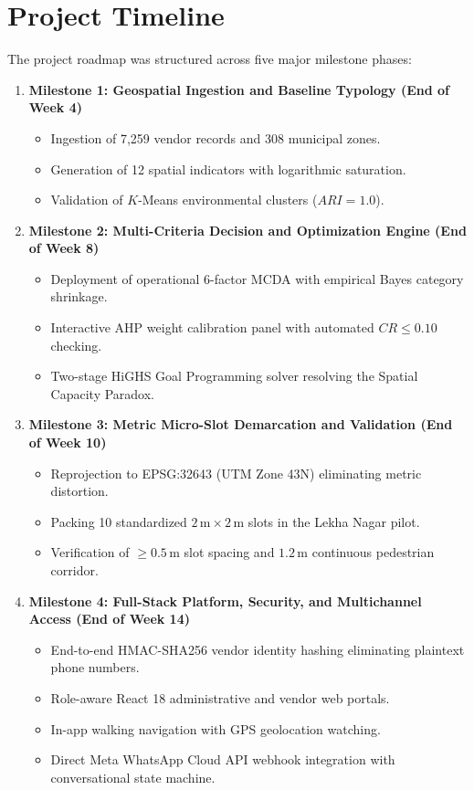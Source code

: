 \section{Project Timeline}
\label{sec:project_timeline}

The project roadmap was structured across five major milestone phases:

\begin{enumerate}
    \item \textbf{Milestone 1: Geospatial Ingestion and Baseline Typology (End of Week 4)}
    \begin{itemize}
        \item Ingestion of 7,259 vendor records and 308 municipal zones.
        \item Generation of 12 spatial indicators with logarithmic saturation.
        \item Validation of $K$-Means environmental clusters ($ARI = 1.0$).
    \end{itemize}
    
    \item \textbf{Milestone 2: Multi-Criteria Decision and Optimization Engine (End of Week 8)}
    \begin{itemize}
        \item Deployment of operational 6-factor MCDA with empirical Bayes category shrinkage.
        \item Interactive AHP weight calibration panel with automated $CR \le 0.10$ checking.
        \item Two-stage HiGHS Goal Programming solver resolving the Spatial Capacity Paradox.
    \end{itemize}
    
    \item \textbf{Milestone 3: Metric Micro-Slot Demarcation and Validation (End of Week 10)}
    \begin{itemize}
        \item Reprojection to EPSG:32643 (UTM Zone 43N) eliminating metric distortion.
        \item Packing 10 standardized $2\,\text{m} \times 2\,\text{m}$ slots in the Lekha Nagar pilot.
        \item Verification of $\ge 0.5\,\text{m}$ slot spacing and $1.2\,\text{m}$ continuous pedestrian corridor.
    \end{itemize}
    
    \item \textbf{Milestone 4: Full-Stack Platform, Security, and Multichannel Access (End of Week 14)}
    \begin{itemize}
        \item End-to-end HMAC-SHA256 vendor identity hashing eliminating plaintext phone numbers.
        \item Role-aware React 18 administrative and vendor web portals.
        \item In-app walking navigation with GPS geolocation watching.
        \item Direct Meta WhatsApp Cloud API webhook integration with conversational state machine.
    \end{itemize}
    

\end{enumerate}
